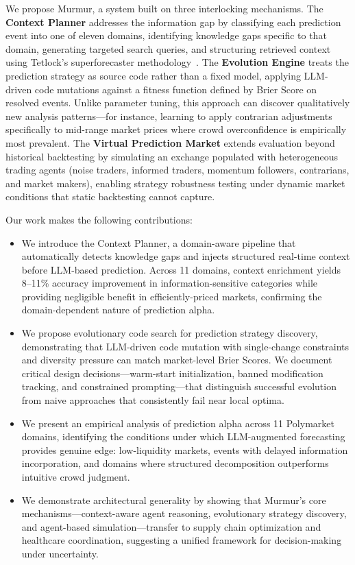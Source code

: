 We propose Murmur, a system built on three interlocking mechanisms. The \textbf{Context Planner} addresses the information gap by classifying each prediction event into one of eleven domains, identifying knowledge gaps specific to that domain, generating targeted search queries, and structuring retrieved context using Tetlock's superforecaster methodology~\cite{tetlock2015superforecasting}. The \textbf{Evolution Engine} treats the prediction strategy as source code rather than a fixed model, applying LLM-driven code mutations against a fitness function defined by Brier Score on resolved events. Unlike parameter tuning, this approach can discover qualitatively new analysis patterns---for instance, learning to apply contrarian adjustments specifically to mid-range market prices where crowd overconfidence is empirically most prevalent. The \textbf{Virtual Prediction Market} extends evaluation beyond historical backtesting by simulating an exchange populated with heterogeneous trading agents (noise traders, informed traders, momentum followers, contrarians, and market makers), enabling strategy robustness testing under dynamic market conditions that static backtesting cannot capture.

Our work makes the following contributions:

\begin{itemize}
    \item We introduce the Context Planner, a domain-aware pipeline that automatically detects knowledge gaps and injects structured real-time context before LLM-based prediction. Across 11 domains, context enrichment yields 8--11\% accuracy improvement in information-sensitive categories while providing negligible benefit in efficiently-priced markets, confirming the domain-dependent nature of prediction alpha.
    
    \item We propose evolutionary code search for prediction strategy discovery, demonstrating that LLM-driven code mutation with single-change constraints and diversity pressure can match market-level Brier Scores. We document critical design decisions---warm-start initialization, banned modification tracking, and constrained prompting---that distinguish successful evolution from naive approaches that consistently fail near local optima.
    
    \item We present an empirical analysis of prediction alpha across 11 Polymarket domains, identifying the conditions under which LLM-augmented forecasting provides genuine edge: low-liquidity markets, events with delayed information incorporation, and domains where structured decomposition outperforms intuitive crowd judgment.
    
    \item We demonstrate architectural generality by showing that Murmur's core mechanisms---context-aware agent reasoning, evolutionary strategy discovery, and agent-based simulation---transfer to supply chain optimization and healthcare coordination, suggesting a unified framework for decision-making under uncertainty.
\end{itemize}
